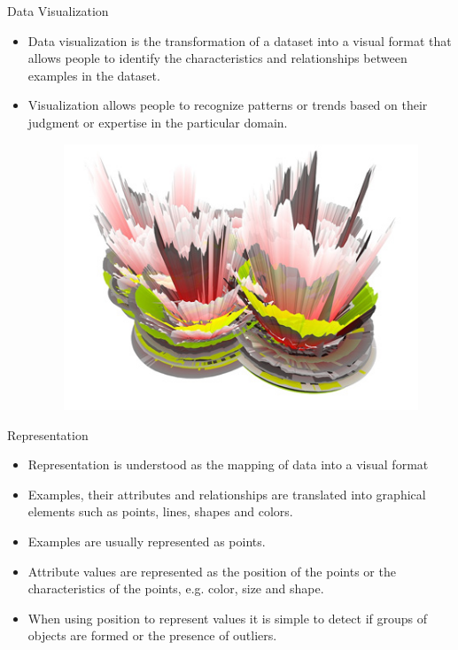 \documentclass[handout]{beamer}
\begin{document}
\begin{frame}[fragile]{Data Visualization}
\scriptsize{
\begin{itemize} 
 \item Data visualization is the transformation of a dataset into a visual format that allows people to identify the characteristics and relationships between examples in the dataset.
 
 \item Visualization allows people to recognize patterns or trends based on their judgment or expertise in the particular domain.
 
   \begin{figure}[h!]
	\centering
	\includegraphics[scale=0.38]{pics/visua.jpg}
	
	
\end{figure} 
 
\end{itemize}

}
 
\end{frame}

\begin{frame}{Representation}
\scriptsize{
\begin{itemize}
 \item Representation is understood as the mapping of data into a visual format
 \item Examples, their attributes and relationships are translated into graphical elements such as points, lines, shapes and colors.  
  \item Examples are usually represented as points.
  \item Attribute values are represented as the position of the points or the characteristics of the points, e.g. color, size and shape.
  \item When using position to represent values it is simple to detect if groups of objects are formed or the presence of outliers. 
  
 
 
\end{itemize}
 
 

 
}
\end{frame}
\end{document}
